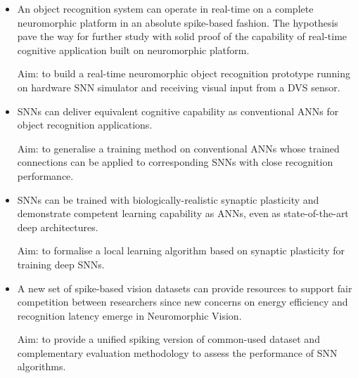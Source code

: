 \begin{itemize}
	\item 
	An object recognition system can operate in real-time on a complete neuromorphic platform in an absolute spike-based fashion.
	The hypothesis pave the way for further study with solid proof of the capability of real-time cognitive application built on neuromorphic platform.

	Aim: to build a real-time neuromorphic object recognition prototype running on hardware SNN simulator and receiving visual input from a DVS sensor.

	\item 
	SNNs can deliver equivalent cognitive capability as conventional ANNs for object recognition applications.

	Aim: to generalise a training method on conventional ANNs whose trained connections can be applied to corresponding SNNs with close recognition performance.

	\item 
	SNNs can be trained with biologically-realistic synaptic plasticity and demonstrate competent learning capability as ANNs, even as state-of-the-art deep architectures.

	Aim: to formalise a local learning algorithm based on synaptic plasticity for training deep SNNs.

	\item 
	A new set of spike-based vision datasets can provide resources to support fair competition between researchers since new concerns on energy efficiency and recognition latency emerge in Neuromorphic Vision.

	Aim: to provide a unified spiking version of common-used dataset and complementary evaluation methodology to assess the performance of SNN algorithms.
\end{itemize}


